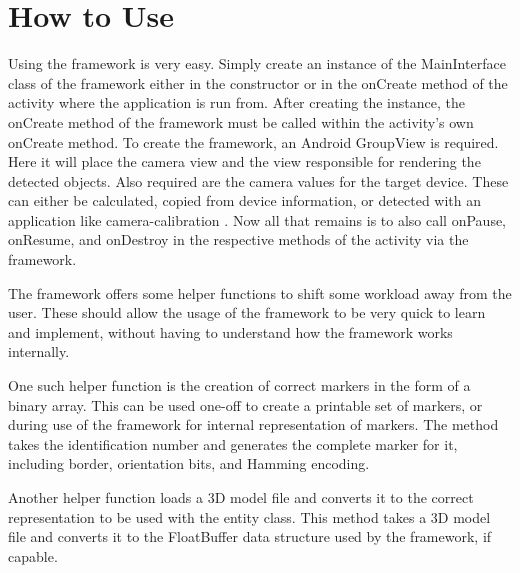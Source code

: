 \section{How to Use}

Using the framework is very easy.
Simply create an instance of the MainInterface class of the framework either in the constructor or in the onCreate method of the activity where the application is run from.
After creating the instance, the onCreate method of the framework must be called within the activity's own onCreate method.
To create the framework, an Android GroupView is required.
Here it will place the camera view and the view responsible for rendering the detected objects. Also required are the camera values for the target device.
These can either be calculated, copied from device information, or detected with an application like camera-calibration \cite{calib}.
Now all that remains is to also call onPause, onResume, and onDestroy in the respective methods of the activity via the framework.

The framework offers some helper functions to shift some workload away from the user.
These should allow the usage of the framework to be very quick to learn and implement, without having to understand how the framework works internally.

One such helper function is the creation of correct markers in the form of a binary array.
This can be used one-off to create a printable set of markers, or during use of the framework for internal representation of markers.
The method takes the identification number and generates the complete marker for it, including border, orientation bits, and Hamming encoding.

Another helper function loads a 3D model file and converts it to the correct representation to be used with the entity class.
This method takes a 3D model file and converts it to the FloatBuffer data structure used by the framework, if capable.
